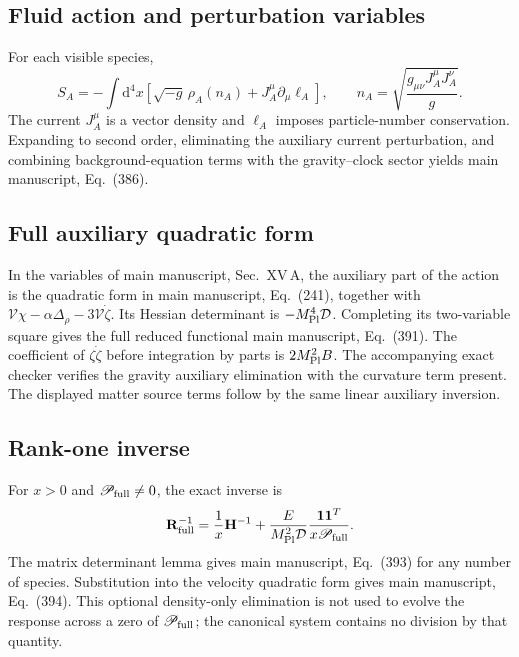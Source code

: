 \documentclass[aps,prd,reprint,onecolumn,notitlepage,nofootinbib,longbibliography,floatfix]{revtex4-2}
\theoremstyle{scstyle}
\theoremstyle{definition}
\theoremstyle{remark}
\newcommand{\dd}{\mathrm{d}}
\newcommand{\mpl}{M_{\rm Pl}}
\begin{document}
\subsection{Fluid action and perturbation variables}

For each visible species,
\begin{equation}
S_A=-\int\dd^4x\left[
\sqrt{-g}\,\rho_A(n_A)+J_A^\mu\partial_\mu\ell_A
\right],
\qquad
n_A=\sqrt{\frac{g_{\mu\nu}J_A^\mu J_A^\nu}{g}}.
\label{eq:appmixSchutz}
\end{equation}
The current $J_A^\mu$ is a vector density and $\ell_A$ imposes particle-number conservation. Expanding to second order, eliminating the auxiliary current perturbation, and combining background-equation terms with the gravity--clock sector yields main manuscript, Eq.~(386).


\subsection{Full auxiliary quadratic form}
In the variables of main manuscript, Sec.~XV\,A, the auxiliary part of the
action is the quadratic form in main manuscript, Eq.~(241), together with
$\mathcal V\chi-\alpha\Delta_\rho-3\mathcal V\dot\zeta$.
Its Hessian determinant is $-\mpl^4\mathcal D$. Completing its two-variable
square gives the full reduced functional
main manuscript, Eq.~(391). The coefficient of
$\zeta\dot\zeta$ before integration by parts is $2\mpl^2B$.
The accompanying exact checker verifies the gravity auxiliary
elimination with the curvature term present. The displayed matter
source terms follow by the same linear auxiliary inversion.

\subsection{Rank-one inverse}
For $x>0$ and $\mathscr P_{\rm full}\ne0$, the exact inverse is
\begin{equation}
\mathbf R_{\rm full}^{-1}
=\frac1x\mathbf H^{-1}
+\frac{E}{\mpl^2\mathcal D}
\frac{\boldsymbol1\boldsymbol1^T}{x\mathscr P_{\rm full}}.
\label{eq:mixRinverse}
\end{equation}
The matrix determinant lemma gives main manuscript, Eq.~(393) for any number of
species. Substitution into the velocity quadratic form gives
main manuscript, Eq.~(394). This optional density-only elimination is
not used to evolve the response across a zero of $\mathscr P_{\rm full}$;
the canonical system contains no division by that quantity.
\end{document}
